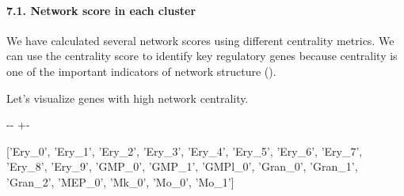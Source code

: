 \documentclass[letterpaper,10pt,english]{sphinxmanual}
\newlength\nbsphinxcodecellspacing
\begin{document}
\paragraph{7.1. Network score in each cluster}
\label{\detokenize{notebooks/04_Network_analysis/Network_analysis_with_Paul_etal_2015_data:7.1.-Network-score-in-each-cluster}}
We have calculated several network scores using different centrality metrics. We can use the centrality score to identify key regulatory genes because centrality is one of the important indicators of network structure ().

Let’s visualize genes with high network centrality.

{
\begin{sphinxVerbatim}[commandchars=\\\{\}]
\llap{\color{nbsphinxin}[83]:\,\hspace{\fboxrule}\hspace{\fboxsep}}
\end{sphinxVerbatim}
}

{

\kern-\sphinxverbatimsmallskipamount\kern-\baselineskip
\kern+\FrameHeightAdjust\kern-\fboxrule
\vspace{\nbsphinxcodecellspacing}

\begin{sphinxVerbatim}[commandchars=\\\{\}]
\llap{\color{nbsphinxout}[83]:\,\hspace{\fboxrule}\hspace{\fboxsep}}['Ery\_0',
 'Ery\_1',
 'Ery\_2',
 'Ery\_3',
 'Ery\_4',
 'Ery\_5',
 'Ery\_6',
 'Ery\_7',
 'Ery\_8',
 'Ery\_9',
 'GMP\_0',
 'GMP\_1',
 'GMPl\_0',
 'Gran\_0',
 'Gran\_1',
 'Gran\_2',
 'MEP\_0',
 'Mk\_0',
 'Mo\_0',
 'Mo\_1']
\end{sphinxVerbatim}
}

{
\begin{sphinxVerbatim}[commandchars=\\\{\}]
\llap{\color{nbsphinxin}[53]:\,\hspace{\fboxrule}\hspace{\fboxsep}}
  
\end{sphinxVerbatim}
}
\end{document}
